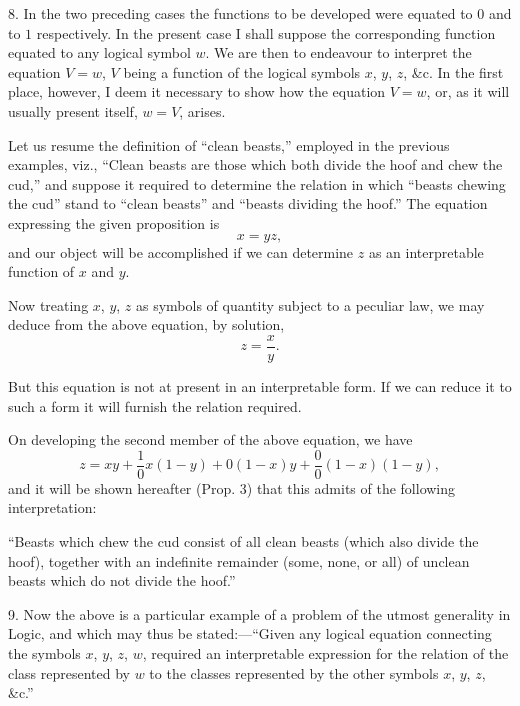 \documentclass[oneside]{book}
\begin{document}
8. In the two preceding cases the functions to be developed
were equated to $0$ and to $1$ respectively. In the present case I
shall suppose the corresponding function equated to any logical
symbol $w$. We are then to endeavour to interpret the equation
$V = w$, $V$ being a function of the logical symbols $x$, $y$, $z$, \&c. In
the first place, however, I deem it necessary to show how the
equation $V=w$, or, as it will usually present itself, $w=V$, arises.

Let us resume the definition of ``clean beasts,'' employed in
the previous examples, viz., ``Clean beasts are those which both
divide the hoof and chew the cud,'' and suppose it required to determine
the relation in which ``beasts chewing the cud'' stand to
``clean beasts'' and ``beasts dividing the hoof.'' The equation
expressing the given proposition is
\[
x=yz,
\]
and our object will be accomplished if we can determine $z$ as an
interpretable function of $x$ and $y$.

Now treating $x$, $y$, $z$ as symbols of quantity subject to a peculiar
law, we may deduce from the above equation, by solution,
\[
z=\frac{x}{y}.
\]

But this equation is not at present in an interpretable form. If
we can reduce it to such a form it will furnish the relation
required.

On developing the second member of the above equation, we
have
\[
z = xy + \frac{1}{0}x\left(1 -y\right) + 0\left(1 -x\right)y + \frac{0}{0}\left(1-x\right)\left(1-y\right),
\]
and it will be shown hereafter (Prop. 3) that this admits of the
following interpretation:

``Beasts which chew the cud consist of all clean beasts
(which also divide the hoof), together with an indefinite remainder
(some, none, or all) of unclean beasts which do not divide
the hoof.''

9. Now the above is a particular example of a problem of the
utmost generality in Logic, and which may thus be stated:---``Given
any logical equation connecting the symbols $x$, $y$, $z$, $w$,
required an interpretable expression for the relation of the class
represented by $w$ to the classes represented by the other symbols
$x$, $y$, $z$, \&c.''
\end{document}
